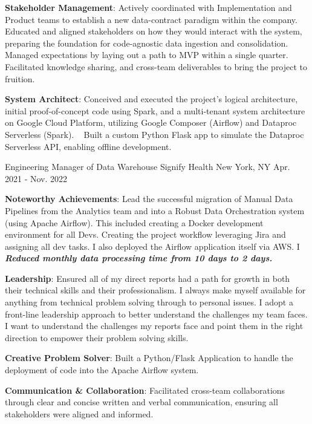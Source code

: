 \begin{cventries}
{\begin{cvitems}
          \item {\textbf{Stakeholder Management}: Actively coordinated with Implementation and Product teams to establish a new data-contract paradigm within the company. Educated and aligned stakeholders on how they would interact with the system, preparing the foundation for code-agnostic data ingestion and consolidation. Managed expectations by laying out a path to MVP within a single quarter. Facilitated knowledge sharing, and cross-team deliverables to bring the project to fruition.}
          \item {\textbf{System Architect}: Conceived and executed the project's logical architecture, initial proof-of-concept code using Spark, and a multi-tenant system architecture on Google Cloud Platform, utilizing Google Composer (Airflow) and Dataproc Serverless (Spark). ~ Built a custom Python Flask app to simulate the Dataproc Serverless API, enabling offline development.}
      \end{cvitems}
    }
  \cventry
    {Engineering Manager of Data Warehouse}
    {Signify Health}
    {New York, NY}
    {Apr. 2021 - Nov. 2022}
    {
      \begin{cvitems}
          \item {\textbf{Noteworthy Achievements}: Lead the successful migration of Manual Data Pipelines from the Analytics team and into a Robust Data Orchestration system (using Apache Airflow). This included creating a Docker development environment for all Devs. Creating the project workflow leveraging Jira and assigning all dev tasks. I also deployed the Airflow application itself via AWS. I \textbf{\emph{Reduced monthly data processing time from 10 days to 2 days.}}
          \item {\textbf{Leadership}: Ensured all of my direct reports had a path for growth in both their technical skills and their professionalism. I always make myself available for anything from technical problem solving through to personal issues. I adopt a front-line leadership approach to better understand the challenges my team faces. I want to understand the challenges my reports face and point them in the right direction to empower their problem solving skills.}
          \item {\textbf{Creative Problem Solver}: Built a Python/Flask Application to handle the deployment of code into the Apache Airflow system.}
          \item {\textbf{Communication \& Collaboration}}: Facilitated cross-team collaborations through clear and concise written and verbal communication, ensuring all stakeholders were aligned and informed.}

\end{cvitems}}
\end{cventries}
